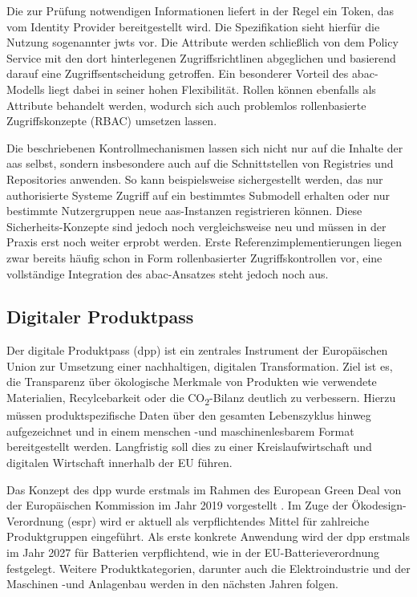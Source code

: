 Die zur Prüfung notwendigen Informationen liefert in der Regel ein Token, das vom Identity Provider bereitgestellt wird. Die Spezifikation sieht hierfür die Nutzung sogenannter \acp{jwt} vor.
Die Attribute werden schließlich von dem Policy Service mit den dort hinterlegenen Zugriffsrichtlinen abgeglichen und basierend darauf eine Zugriffsentscheidung getroffen.
Ein besonderer Vorteil des \acs{abac}-Modells liegt dabei in seiner hohen Flexibilität. Rollen können ebenfalls als Attribute behandelt werden, wodurch sich auch problemlos rollenbasierte Zugriffskonzepte (RBAC) umsetzen lassen. 

Die beschriebenen Kontrollmechanismen lassen sich nicht nur auf die Inhalte der \acs{aas} selbst, sondern insbesondere auch auf die Schnittstellen von Registries und Repositories anwenden.
So kann beispielsweise sichergestellt werden, das nur authorisierte Systeme Zugriff auf ein bestimmtes Submodell erhalten oder nur bestimmte Nutzergruppen neue \acs{aas}-Instanzen registrieren können.
Diese Sicherheits-Konzepte sind jedoch noch vergleichsweise neu und müssen in der Praxis erst noch weiter erprobt werden.
Erste Referenzimplementierungen liegen zwar bereits häufig schon in Form rollenbasierter Zugriffskontrollen vor, eine vollständige Integration des \acs{abac}-Ansatzes steht jedoch noch aus.


\subsection{Digitaler Produktpass}
Der digitale Produktpass (\acs{dpp}) ist ein zentrales Instrument der Europäischen Union zur Umsetzung einer nachhaltigen, digitalen Transformation.
Ziel ist es, die Transparenz über ökologische Merkmale von Produkten wie verwendete Materialien, Recylcebarkeit oder die CO\textsubscript{2}-Bilanz deutlich zu verbessern.
Hierzu müssen produktspezifische Daten über den gesamten Lebenszyklus hinweg aufgezeichnet und in einem menschen -und maschinenlesbarem Format bereitgestellt werden.
Langfristig soll dies zu einer Kreislaufwirtschaft und digitalen Wirtschaft innerhalb der EU führen.

Das Konzept des \acs{dpp} wurde erstmals im Rahmen des European Green Deal von der Europäischen Kommission im Jahr 2019 vorgestellt \cite{GreenDeal}.
Im Zuge der Ökodesign-Verordnung (\ac{espr}) \cite{ESPR} wird er aktuell als verpflichtendes Mittel für zahlreiche Produktgruppen eingeführt.
Als erste konkrete Anwendung wird der \acs{dpp} erstmals im Jahr 2027 für Batterien verpflichtend, wie in der EU-Batterieverordnung festgelegt.
Weitere Produktkategorien, darunter auch die Elektroindustrie und der Maschinen -und Anlagenbau werden in den nächsten Jahren folgen.

